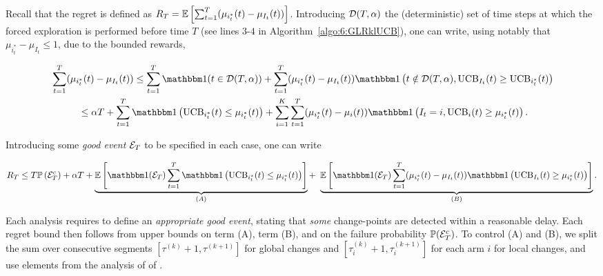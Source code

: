 Recall that the regret is defined as $R_T = \mathbb{E}\left[\sum_{t=1}^T(\mu_{i^*_t}(t) - \mu_{I_t}(t))\right]$. Introducing $\mathcal{D}(T,\alpha)$ the (deterministic) set of time steps at which the forced exploration is performed before time $T$ (see lines $3$-$4$ in Algorithm~\ref{algo:6:GLRklUCB}), one can write, using notably that $\mu_{i^*_t} - \mu_{I_t} \leq 1$, due to the bounded rewards,
\begin{small}
\begin{align*}
 &\sum_{t=1}^T (\mu_{i^*_t}(t) - \mu_{I_t}(t))  \leq  \sum_{t=1}^{T} \indic(t \in \cD(T,\alpha)) + \sum_{t=1}^T (\mu_{i^*_t}(t) - \mu_{I_t}(t))\indic\left(t \notin\cD(T,\alpha), \UCB_{I_t}(t) \geq \UCB_{i^*_t}(t)\right) \\
 & \hspace{1cm}\leq  \alpha T + \sum_{t=1}^T \indic\left(\UCB_{i^*_t}(t) \leq \mu_{i^*_t}(t)\right) + \sum_{i=1}^K\sum_{t=1}^T (\mu_{i^*_t}(t) - \mu_{i}(t))\indic\left(I_t = i, \UCB_{i}(t) \geq \mu_{i^*_t}(t)\right).
\end{align*}%
\end{small}%
%
Introducing some \emph{good event} $\mathcal{E}_T$ to be specified in each case, one can write
%
\begin{footnotesize}
\begin{eqnarray*}
R_T \leq T \bP\left(\cE_T^c\right) + \alpha T + \underbrace{\bE\left[\indic(\cE_T) \sum_{t=1}^T \indic\left(\UCB_{i^*_t}(t) \leq \mu_{i^*_t}(t)\right)\right]}_{(A)} + \ \underbrace{\bE\left[\indic(\cE_T)\sum_{t=1}^T (\mu_{i^*_t}(t) - \mu_{I_t}(t))\indic\left(\UCB_{I_t}(t) \geq \mu_{i^*_t}(t)\right)\right]}_{(B)}.
\end{eqnarray*}%
\end{footnotesize}%
%
Each analysis requires to define an \emph{appropriate good event}, stating that \emph{some} change-points are detected within a reasonable delay. Each regret bound then follows from upper bounds on term (A), term (B), and on the failure probability $\mathbb{P}(\mathcal{E}_T^c)$.
%
To control (A) and (B), we split the sum over consecutive segments $[\tau^{(k)}+1, \tau^{(k+1)}]$ for global changes and $[\tau^{(k)}_i+1, \tau^{(k+1)}_i]$ for each arm $i$ for local changes, and use elements from the analysis of \klUCB{} of \cite{KLUCBJournal}.

